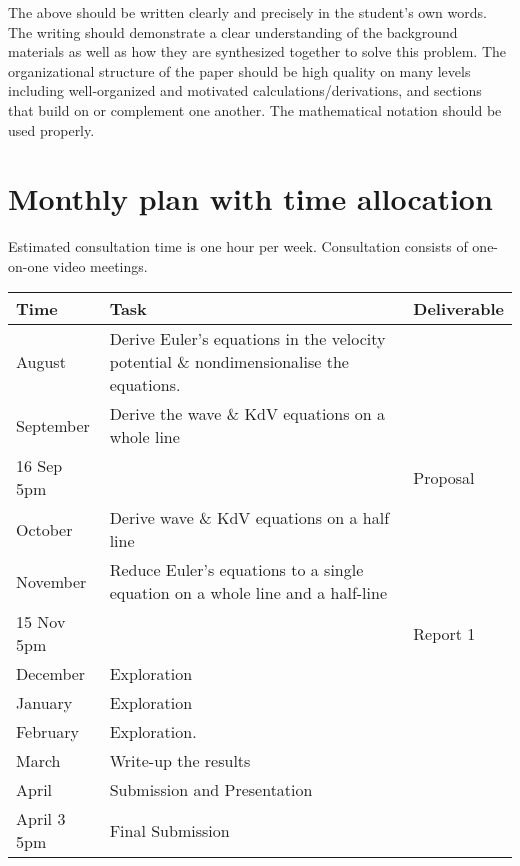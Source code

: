 \documentclass[10pt, oneside, a4paper]{article}
\begin{document}
The above should be written clearly and precisely in the student's own words.  The writing should demonstrate a clear understanding of the background materials as well as how they are synthesized together to solve this problem.  The organizational structure of the paper should be high quality on many levels including well-organized and motivated calculations/derivations, and sections that build on or complement one another.  The mathematical notation should be used properly.  


\section{Monthly plan with time allocation}

Estimated consultation time is one hour per week. Consultation consists of one-on-one video meetings.

\begin{center}
    \begin{tabular}{|l|l|l|} 
        \hline
        Time & Task & Deliverable\\
        \hline
        August & Derive Euler's equations in the velocity potential \& nondimensionalise the equations.  & \\ 
        \hline
        September & Derive the wave \& KdV equations on a whole line & \\ 
        \hline
        16 Sep 5pm & & Proposal \\
        \hline
        October &  Derive wave \& KdV equations on a half line &\\
        \hline
        November & Reduce Euler's equations to a single equation on a whole line and a half-line &\\
        \hline 
        15 Nov 5pm & & Report 1 \\
        \hline
        December & Exploration &\\
        \hline
        January & Exploration &\\
        \hline
        February & Exploration. &\\
        \hline
        March & Write-up the results &\\
        \hline
        April & Submission and Presentation &\\
        \hline 
        April 3 5pm & Final Submission &\\
        \hline
    \end{tabular}
 
\end{center}
\end{document}

